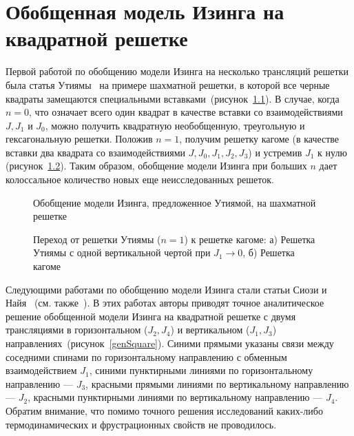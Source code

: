 \chapter{Обобщенная модель Изинга на квадратной решетке}\label{ch:ch4}

Первой работой по обобщению модели Изинга на несколько трансляций решетки была статья Утиямы~\cite{utiyama1951} на примере шахматной решетки, в которой все черные квадраты замещаются специальными вставками~(рисунок~\ref{utiyamaGen}). В случае, когда $n=0$, что означает всего один квадрат в качестве вставки со взаимодействиями $J, J_1$ и $J_0$, можно получить квадратную необобщенную, треугольную и гексагональную решетки. Положив $n=1$, получим решетку кагоме (в качестве вставки два квадрата со взаимодействиями $J, J_0, J_1, J_2, J_3$) и устремив $J_1$ к нулю (рисунок~\ref{toKagome}). Таким образом, обобщение модели Изинга при больших $n$ дает колоссальное количество новых еще неисследованных решеток.

 \begin{figure}[h]
 	\caption{Обобщение модели Изинга, предложенное Утиямой, на шахматной решетке}
 	\label{utiyamaGen}
 \end{figure}

 \begin{figure}[h]
 	\begin{minipage}{0.45\linewidth}
 	\end{minipage}
 	\hfill
 	\begin{minipage}{0.45\linewidth}
 	\end{minipage}
 	\caption{Переход от решетки Утиямы ($n=1$) к решетке кагоме: а) Решетка Утиямы с одной вертикальной чертой при $J_1 \rightarrow 0$, б) Решетка кагоме}
 	\label{toKagome}
 \end{figure}

Следующими работами по обобщению модели Изинга стали статьи Сиози и Найя~\cite{syozi1960} (см. также~\cite{siozi_domb1972}). В этих работах авторы приводят точное аналитическое решение обобщенной модели Изинга на квадратной решетке с двумя трансляциями в горизонтальном ($J_{2}, J_{4}$) и вертикальном ($J_{1}, J_{3}$) направлениях~(рисунок~\ref{genSquare}). Синими прямыми указаны связи между соседними спинами по горизонтальному направлению с обменным взаимодействием $J_1$, синими пунктирными линиями по горизонтальному направлению  --- $J_3$, красными прямыми линиями по вертикальному направлению --- $J_2$, красными пунктирными линиями по вертикальному направлению --- $J_4$. Обратим внимание, что помимо точного решения исследований каких-либо термодинамических и фрустрационных свойств не проводилось.


